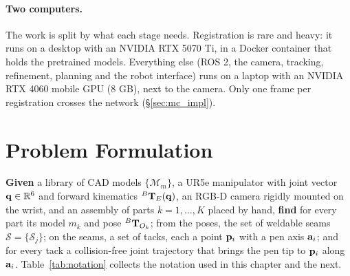 \paragraph{Two computers.} The work is split by what each stage needs. Registration is rare and
heavy: it runs on a desktop with an NVIDIA RTX 5070 Ti, in a Docker container that holds the
pretrained models. Everything else (ROS 2, the camera, tracking, refinement, planning and the
robot interface) runs on a laptop with an NVIDIA RTX 4060 mobile GPU (8 GB), next to the camera.
Only one frame per registration crosses the network (\S\ref{sec:mc_impl}).


\section{Problem Formulation}
\label{sec:mc_problem}
\textbf{Given} a library of CAD models $\{\mathcal{M}_m\}$, a UR5e manipulator with joint
vector $\mathbf{q}\in\mathbb{R}^6$ and forward kinematics ${}^{B}\mathbf{T}_{E}(\mathbf{q})$, an RGB-D camera
rigidly mounted on the wrist, and an assembly of parts $k=1,\dots,K$ placed by hand,
\textbf{find} for every part its model $m_k$ and pose ${}^{B}\mathbf{T}_{O_k}$; from the poses, the set of
weldable seams $\mathcal{S}=\{\mathcal{S}_j\}$; on the seams, a set of tacks, each a point
$\mathbf{p}_i$ with a pen axis $\mathbf{a}_i$; and for every tack a collision-free joint trajectory
that brings the pen tip to $\mathbf{p}_i$ along $\mathbf{a}_i$. Table~\ref{tab:notation} collects
the notation used in this chapter and the next.

